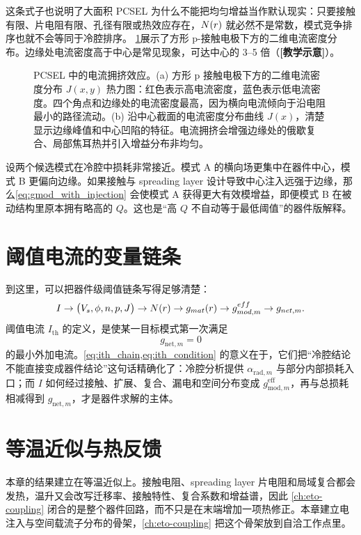 这条式子也说明了大面积 PCSEL 为什么不能把均匀增益当作默认现实：只要接触有限、片电阻有限、孔径有限或热效应存在，$N(r)$ 就必然不是常数，模式竞争排序也就不会等同于冷腔排序。
\cref{fig:ch18_current_crowding}展示了方形 p-接触电极下方的二维电流密度分布。边缘处电流密度高于中心是常见现象，可达中心的 3--5 倍（\textbf{[教学示意]}）。

\begin{figure}[htbp]
  \centering
  
  \caption{PCSEL 中的电流拥挤效应。(a) 方形 p 接触电极下方的二维电流密度分布 $J(x,y)$ 热力图：红色表示高电流密度，蓝色表示低电流密度。四个角点和边缘处的电流密度最高，因为横向电流倾向于沿电阻最小的路径流动。(b) 沿中心截面的电流密度分布曲线 $J(x)$，清楚显示边缘峰值和中心凹陷的特征。电流拥挤会增强边缘处的俄歇复合、局部焦耳热并引入增益分布非均匀。}
  \label{fig:ch18_current_crowding}
\end{figure}
设两个候选模式在冷腔中损耗非常接近。模式 A 的横向场更集中在器件中心，模式 B 更偏向边缘。如果接触与 spreading layer 设计导致中心注入远强于边缘，那么\cref{eq:gmod_with_injection} 会使模式 A 获得更大有效模增益，即便模式 B 在被动结构里原本拥有略高的 $Q$。这也是“高 $Q$ 不自动等于最低阈值”的器件版解释。

\section{阈值电流的变量链条}
到这里，可以把器件级阈值链条写得足够清楚：
\begin{equation}
I
\rightarrow
\bigl(V_s,\phi,n,p,J\bigr)
\rightarrow
N(r)
\rightarrow
g_{mat}(r)
\rightarrow
g_{mod,m}^{eff}
\rightarrow
g_{net,m}.
\label{eq:ith_chain}
\end{equation}
阈值电流 $I_{\mathrm{th}}$ 的定义，是使某一目标模式第一次满足
\begin{equation}
 g_{\mathrm{net},m}=0
\label{eq:ith_condition}
\end{equation}
的最小外加电流。\cref{eq:ith_chain,eq:ith_condition} 的意义在于，它们把“冷腔结论不能直接变成器件结论”这句话精确化了：冷腔分析提供 $\alpha_{\mathrm{rad},m}$ 与部分内部损耗入口；而 $I$ 如何经过接触、扩展、复合、漏电和空间分布变成 $g_{\mathrm{mod},m}^{\mathrm{eff}}$，再与总损耗相减得到 $g_{\mathrm{net},m}$，才是器件求解的主体。

\section{等温近似与热反馈}
本章的结果建立在等温近似上。接触电阻、spreading layer 片电阻和局域复合都会发热，温升又会改写迁移率、接触特性、复合系数和增益谱，因此 \cref{ch:eto-coupling} 闭合的是整个器件回路，而不只是在末端增加一项热修正。本章建立电注入与空间载流子分布的骨架，\cref{ch:eto-coupling} 把这个骨架放到自洽工作点里。

